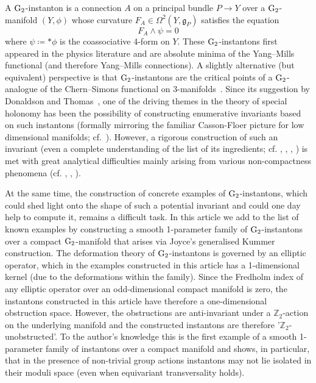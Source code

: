 \documentclass[11pt,a4paper]{scrartcl}
\newcommand{\G}{\textup{G}}
\numberwithin{equation}{section}
\theoremstyle{plain}
\theoremstyle{definition}
\theoremstyle{remark}
\begin{document}
A $\G_2$-instanton is a connection $A$ on a principal bundle $P \to Y$ over a $\G_2$-manifold $(Y,\phi)$ whose curvature $F_A\in \Omega^2(Y,\mathfrak{g}_P)$ satisfies the equation \[ F_A \wedge \psi =0 \] where $\psi \coloneqq * \phi$ is the coassociative 4-form on $Y$. These $\G_2$-instantons first appeared in the physics literature \cite{CorriganEtAl-Omega-ASD} and are absolute minima of the Yang--Mills functional (and therefore Yang--Mills connections). A slightly alternative (but equivalent) perspective is that $\G_2$-instantons are the critical points of a $\G_2$-analogue of the Chern--Simons functional on 3-manifolds~\cite{DonaldsonThomas-HigherDimGaugeTheory}. Since its suggestion by Donaldson and Thomas~\cite{DonaldsonThomas-HigherDimGaugeTheory}, one of the driving themes in the theory of special holonomy has been the possibility of constructing enumerative invariants based on such instantons (formally mirroring the familiar Casson-Floer picture for low dimensional manifolds; cf.~\cite{DonaldsonSegal-Gauge}). However, a rigorous construction of such an invariant (even a complete understanding of the list of its ingredients; cf. \cite[Section~6.2]{DonaldsonSegal-Gauge}, \cite[Chapter~6]{Walpuski-Diss}, \cite{Haydys-G2Instantons_and_SW}, \cite{DoanWalpuski-countingAssociatives}) is met with great analytical difficulties mainly arising from various non-compactness phenomena (cf. \cite{Tian-Gauge+Calibrations}, \cite{Walpuski-instantons-associatives-fueter}, \cite{Bera-CSAssociatives}). 

At the same time, the construction of concrete examples of $\G_2$-instantons, which could shed light onto the shape of such a potential invariant and could one day help to compute it, remains a difficult task. In this article we add to the list of known examples by constructing a smooth 1-parameter family of $\G_2$-instantons over a compact $\G_2$-manifold that arises via Joyce's generalised Kummer construction. The deformation theory of $\G_2$-instantons is governed by an elliptic operator, which in the examples constructed in this article has a 1-dimensional kernel (due to the deformations within the family). Since the Fredholm index of any elliptic operator over an odd-dimensional compact manifold is zero, the instantons constructed in this article have therefore a one-dimensional obstruction space. However, the obstructions are anti-invariant under a $\mathbb{Z}_2$-action on the underlying manifold and the constructed instantons are therefore '$\mathbb{Z}_2$-unobstructed'. To the author's knowledge this is the first example of a smooth 1-parameter family of instantons over a compact manifold and shows, in particular, that in the presence of non-trivial group actions instantons may not lie isolated in their moduli space (even when equivariant transversality holds).
 
\end{document}
